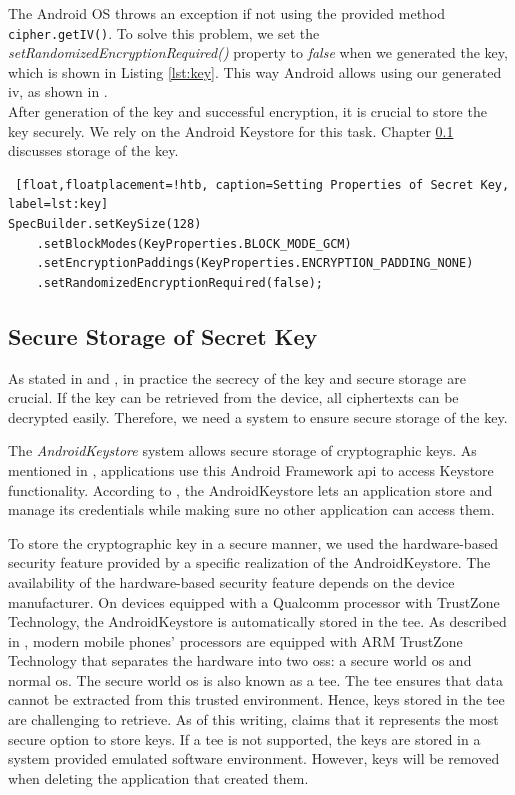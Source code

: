 The Android OS throws an exception if not using the provided method \texttt{cipher.getIV()}. To solve this problem, we set the \textit{setRandomizedEncryptionRequired()} property to \textit{false} when we generated the key, which is shown in Listing \ref{lst:key}. This way Android allows using our generated \gls{iv}, as shown in \cite{SecretsInAndroid}. \\
After generation of the key and successful encryption, it is crucial to store the key securely. We rely on the Android Keystore for this task. Chapter \ref{arch_keystore} discusses storage of the key. \\


\begin{lstlisting} [float,floatplacement=!htb, caption=Setting Properties of Secret Key, label=lst:key]
SpecBuilder.setKeySize(128)
    .setBlockModes(KeyProperties.BLOCK_MODE_GCM)
    .setEncryptionPaddings(KeyProperties.ENCRYPTION_PADDING_NONE)
    .setRandomizedEncryptionRequired(false);
\end{lstlisting}




\subsection{Secure Storage of Secret Key} \label{arch_keystore}
As stated in \cite{dworkin2007sp} and \cite{CooijmansRP14},  in practice the secrecy of the key and secure storage are crucial. If the key can be retrieved from the device, all ciphertexts can be decrypted easily. Therefore, we need a system to ensure secure storage of the key.

The \textit{AndroidKeystore} system allows secure storage of cryptographic keys. As mentioned in \cite{HWBKeyStore}, applications use this Android Framework \gls{api} to access Keystore functionality. According to \cite{AndroidKeyStoreSystem}, the AndroidKeystore lets an application store and manage its credentials while making sure no other application can access them.

To store the cryptographic key in a secure manner, we used the hardware-based security feature provided by a specific realization of the AndroidKeystore. The availability of the hardware-based security feature depends on the device manufacturer. 
On devices equipped with a Qualcomm processor with TrustZone Technology, the AndroidKeystore is automatically stored in the \acrfull{tee}. As described in \cite{CooijmansRP14}, modern mobile phones' processors are equipped with ARM TrustZone Technology that separates the hardware into two \glspl{os}: a secure world \gls{os} and normal \gls{os}. The secure world \gls{os} is also known as a \gls{tee}. The \gls{tee} ensures that data cannot be extracted from this trusted environment. Hence, keys stored in the \gls{tee} are challenging to retrieve.
As of this writing, \cite{SecureDataEncryption} claims that it represents the most secure option to store keys. If a \gls{tee} is not supported, the keys are stored in a system provided emulated software environment. However, keys will be removed when deleting the application that created them.

